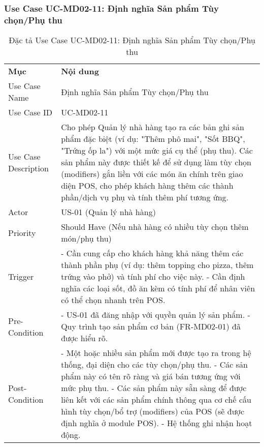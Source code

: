 \subsubsection{Use Case UC-MD02-11: Định nghĩa Sản phẩm Tùy chọn/Phụ thu}
\begin{longtable}{|m{4cm}|p{11cm}|}
\caption{Đặc tả Use Case UC-MD02-11: Định nghĩa Sản phẩm Tùy chọn/Phụ thu} \label{tab:uc_md02_11} \\
\hline

\endhead %

\hline
\endfoot %

\hline
\endlastfoot %
\multicolumn{2}{|c|}{\textbf{2.1. Tóm tắt (Summary)}} \\
\hline
\textbf{Mục} & \textbf{Nội dung} \\
\hline
Use Case Name & Định nghĩa Sản phẩm Tùy chọn/Phụ thu \\
\hline
Use Case ID & UC-MD02-11 \\
\hline
Use Case Description & Cho phép Quản lý nhà hàng tạo ra các bản ghi sản phẩm đặc biệt (ví dụ: "Thêm phô mai", "Sốt BBQ", "Trứng ốp la") với một mức giá cụ thể (phụ thu). Các sản phẩm này được thiết kế để sử dụng làm tùy chọn (modifiers) gắn liền với các món ăn chính trên giao diện POS, cho phép khách hàng thêm các thành phần/dịch vụ phụ và tính thêm phí tương ứng. \\
\hline
Actor & US-01 (Quản lý nhà hàng) \\
\hline
Priority & Should Have (Nếu nhà hàng có nhiều tùy chọn thêm món/phụ thu) \\
\hline
Trigger & - Cần cung cấp cho khách hàng khả năng thêm các thành phần phụ (ví dụ: thêm topping cho pizza, thêm trứng vào phở) và tính phí cho việc này. \newline - Cần định nghĩa các loại sốt, đồ ăn kèm có tính phí để nhân viên có thể chọn nhanh trên POS. \\
\hline
Pre-Condition & - US-01 đã đăng nhập với quyền quản lý sản phẩm. \newline - Quy trình tạo sản phẩm cơ bản (FR-MD02-01) đã được hiểu rõ. \\
\hline
Post-Condition & - Một hoặc nhiều sản phẩm mới được tạo ra trong hệ thống, đại diện cho các tùy chọn/phụ thu. \newline - Các sản phẩm này có tên rõ ràng và giá bán tương ứng với mức phụ thu. \newline - Các sản phẩm này sẵn sàng để được liên kết với các sản phẩm chính thông qua cơ chế cấu hình tùy chọn/bổ trợ (modifiers) của POS (sẽ được định nghĩa ở module POS). \newline - Hệ thống ghi nhận hoạt động. \\

\end{longtable}
